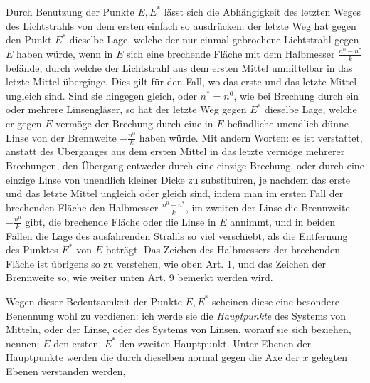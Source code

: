 Durch Benutzung der Punkte $E,E^*$ lässt sich die Abhängigkeit des letzten Weges des Lichtstrahls von dem ersten einfach so ausdrücken: der letzte Weg hat gegen den Punkt $E^*$ dieselbe Lage, welche der nur einmal gebrochene Lichtstrahl gegen $E$ haben würde, wenn in $E$ sich eine brechende Fläche mit dem Halbmesser $\frac{n^0-n^*}{k}$ befände, durch welche der Lichtstrahl aus dem ersten Mittel unmittelbar in das letzte Mittel überginge. Dies gilt für den Fall, wo das erste und das letzte Mittel ungleich sind. Sind sie hingegen gleich, oder $n^*=n^0$, wie bei Brechung durch ein oder mehrere Linsengläser, so hat der letzte Weg gegen $E^*$ dieselbe Lage, welche er gegen $E$ vermöge der Brechung durch eine in $E$ befindliche unendlich dünne Linse von der Brennweite $-\frac{n^0}k$ haben würde. Mit andern Worten: es ist verstattet, anstatt des Überganges aus dem ersten Mittel in das letzte vermöge mehrerer Brechungen, den Übergang entweder durch eine einzige Brechung, oder durch eine einzige Linse von unendlich kleiner Dicke zu substituiren, je nachdem das erste und das letzte Mittel ungleich oder gleich sind, indem man im ersten Fall der brechenden Fläche den Halbmesser $\frac{n^0-n^*}{k}$, im zweiten der Linse die Brennweite $-\frac{n^0}k$ gibt, die brechende Fläche oder die Linse in $E$ annimmt, und in beiden Fällen die Lage des ausfahrenden Strahls so viel verschiebt, als die Entfernung des Punktes $E^*$ von $E$ beträgt. Das Zeichen des Halbmessers der brechenden Fläche ist übrigens so zu verstehen, wie oben Art. 1, und das Zeichen der Brennweite so, wie weiter unten Art. 9 bemerkt werden wird.

Wegen dieser Bedeutsamkeit der Punkte $E,E^*$ scheinen diese eine besondere Benennung wohl zu verdienen: ich werde sie die \textit{Hauptpunkte} des Systems von Mitteln, oder der Linse, oder des Systems von Linsen, worauf sie sich beziehen, nennen; $E$ den ersten, $E^*$ den zweiten Hauptpunkt. Unter Ebenen der Hauptpunkte werden die durch dieselben normal gegen die Axe der $x$ gelegten Ebenen verstanden werden,

